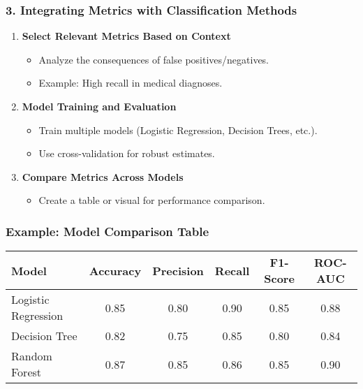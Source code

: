 \documentclass[aspectratio=169]{beamer}
\begin{document}
\begin{frame}[fragile]
    \frametitle{3. Integrating Metrics with Classification Methods}
    \begin{enumerate}
        \item \textbf{Select Relevant Metrics Based on Context}
            \begin{itemize}
                \item Analyze the consequences of false positives/negatives.
                \item Example: High recall in medical diagnoses.
            \end{itemize}
        \item \textbf{Model Training and Evaluation}
            \begin{itemize}
                \item Train multiple models (Logistic Regression, Decision Trees, etc.).
                \item Use cross-validation for robust estimates.
            \end{itemize}
        \item \textbf{Compare Metrics Across Models}
            \begin{itemize}
                \item Create a table or visual for performance comparison.
            \end{itemize}
    \end{enumerate}
\end{frame}

\begin{frame}[fragile]
    \frametitle{Example: Model Comparison Table}
    \begin{table}[ht]
        \centering
        \begin{tabular}{|l|c|c|c|c|c|}
            \hline
            \textbf{Model} & \textbf{Accuracy} & \textbf{Precision} & \textbf{Recall} & \textbf{F1-Score} & \textbf{ROC-AUC} \\
            \hline
            Logistic Regression & 0.85 & 0.80 & 0.90 & 0.85 & 0.88 \\
            Decision Tree & 0.82 & 0.75 & 0.85 & 0.80 & 0.84 \\
            Random Forest & 0.87 & 0.85 & 0.86 & 0.85 & 0.90 \\
            \hline
        \end{tabular}
    \end{table}
\end{frame}
\end{document}
